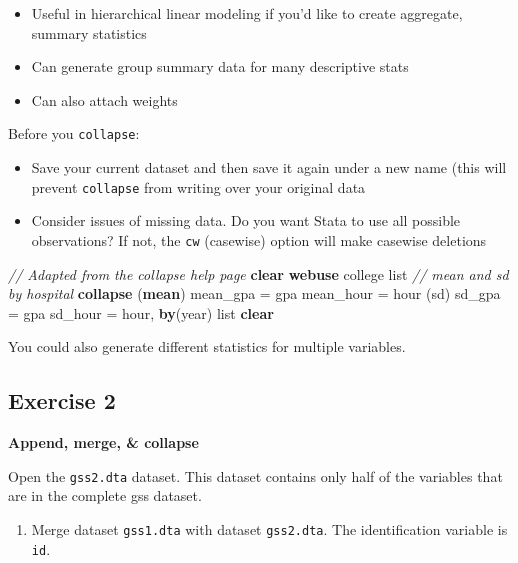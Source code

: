 \documentclass[
]{book}
\newenvironment{Shaded}{\begin{snugshade}}{\end{snugshade}}
\newcommand{\CommentTok}[1]{\textcolor[rgb]{0.56,0.35,0.01}{\textit{#1}}}
\newcommand{\FunctionTok}[1]{\textcolor[rgb]{0.00,0.00,0.00}{#1}}
\newcommand{\KeywordTok}[1]{\textcolor[rgb]{0.13,0.29,0.53}{\textbf{#1}}}
\newcommand{\NormalTok}[1]{#1}
\newcommand{\OtherTok}[1]{\textcolor[rgb]{0.56,0.35,0.01}{#1}}
\providecommand{\tightlist}{%
  \setlength{\itemsep}{0pt}\setlength{\parskip}{0pt}}
\begin{document}
\begin{itemize}
\tightlist
\item
  Useful in hierarchical linear modeling if you'd like to create aggregate, summary statistics
\item
  Can generate group summary data for many descriptive stats
\item
  Can also attach weights
\end{itemize}

Before you \texttt{collapse}:

\begin{itemize}
\tightlist
\item
  Save your current dataset and then save it again under a new name (this will prevent \texttt{collapse} from writing over your original data
\item
  Consider issues of missing data. Do you want Stata to use all possible observations? If not, the \texttt{cw} (casewise) option will make casewise deletions
\end{itemize}

\begin{Shaded}
\begin{Highlighting}[]
\CommentTok{// Adapted from the collapse help page}
\KeywordTok{clear}
\KeywordTok{webuse}\NormalTok{ college}
\OtherTok{list}
\CommentTok{// mean and sd by hospital}
\KeywordTok{collapse}\NormalTok{ (}\KeywordTok{mean}\NormalTok{) mean\_gpa = gpa mean\_hour = hour (}\FunctionTok{sd}\NormalTok{) sd\_gpa = gpa sd\_hour = hour, }\KeywordTok{by}\NormalTok{(}\FunctionTok{year}\NormalTok{)}
\OtherTok{list}
\KeywordTok{clear}
\end{Highlighting}
\end{Shaded}

You could also generate different statistics for multiple variables.

\hypertarget{exercise-2-5}{%
\subsection{Exercise 2}\label{exercise-2-5}}

\textbf{Append, merge, \& collapse}

Open the \texttt{gss2.dta} dataset. This dataset contains only half of the variables that are in the complete gss dataset.

\begin{enumerate}
\def\labelenumi{\arabic{enumi}.}
\tightlist
\item
  Merge dataset \texttt{gss1.dta} with dataset \texttt{gss2.dta}. The identification variable is \texttt{id}.
\end{enumerate}
\end{document}
